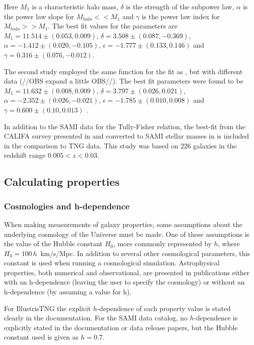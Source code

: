 Here $M_1$ is a characteristic halo mass, $\delta$ is the strength of the subpower law, $\alpha$ is the power law slope for $M_{halo} << M_1$ and $\gamma$ is the power law index for $M_{halo} >> M_1$. The best fit values for the parameters are $M_1 = 11.514\pm(0.053, 0.009)$, $\delta = 3.508 \pm (0.087, -0.369)$, $\alpha = -1.412 \pm (0.020, -0.105)$, $\epsilon = -1.777 \pm (0.133, 0.146)$ and $\gamma = 0.316 \pm (0.076, -0.012)$.

The second study employed the same function for the fit as \textcite{Behroozi2013}, but with different data (//OBS expand a little OBS//). The best fit parameters were found to be $M_1 = 11.632\pm(0.008, 0.009)$, $\delta = 3.797 \pm (0.026, 0.021)$, $\alpha = -2.352 \pm (0.026, -0.021)$, $\epsilon = -1.785 \pm (0.010, 0.008)$  and $\gamma = 0.600 \pm (0.10, 0.013)$ \parencite{Zanisi2019}.

In addition to the SAMI data for the Tully-Fisher relation, the best-fit from the CALIFA survey presented in \textcite{Bekerait2016} and converted to SAMI stellar masses in \textcite{Bloom2017} is included in the comparison to TNG data. This study was based on 226 galaxies in the redshift range $0.005 < z < 0.03$.


\subsection{Calculating properties}

\subsubsection{Cosmologies and h-dependence} \label{cosmologies}
When making measurements of galaxy properties, some assumptions about the underlying cosmology of the Universe must be made. One of these assumptions is the value of the Hubble constant $H_0$, more commonly represented by $h$, where $H_0 = 100\,h\,$ km/s/Mpc. In addition to several other cosmological parameters, this constant is used when running a cosmological simulation. Astrophysical properties, both numerical and observational, are presented in publications either with an h-dependence (leaving the user to specify the cosmology) or without an h-dependence (by assuming a value for h).

For IllustrisTNG the explicit $h$-dependence of each property value is stated clearly in the documentation. For the SAMI data catalog, no $h$-dependence is explicitly stated in the documentation or data release papers, but the Hubble constant used is given as $h = 0.7$.

